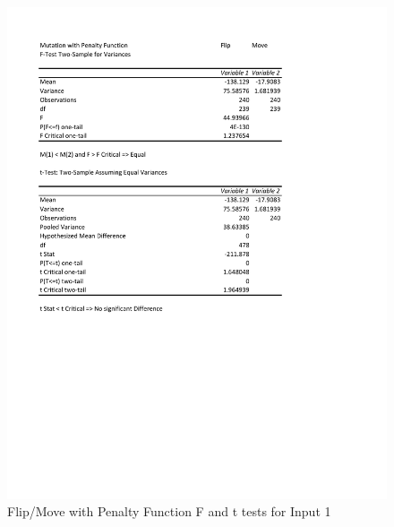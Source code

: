 \documentclass[times]{article}
\begin{document}
	\begin{figure}
		\caption{Flip/Move with Penalty Function F and t tests for Input 1}
		\label{fig:flip_move_penalty1}
		\includegraphics[width=\textwidth]{./t_test/mutation_penalty1}
	\end{figure}
\end{document}
